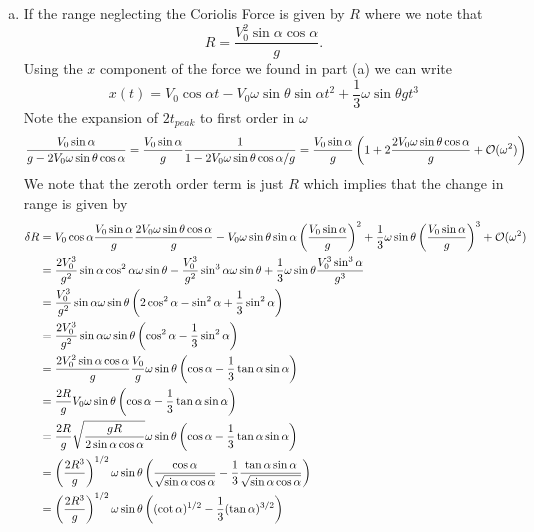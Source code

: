 \documentclass[11pt]{article}
\numberwithin{equation}{section}
\begin{document}
\begin{enumerate}[(a)]
\item If the range neglecting the Coriolis Force is given by $R$ where we note that 
$$R = \frac{V_0^2\sin\alpha\cos\alpha}{g}.$$
Using the $x$ component of the force we found in part (a) we can write 
$$x(t) = V_0\cos\alpha{t} - V_0\omega\sin\theta\sin\alpha{t^2} + \frac{1}{3}\omega\sin\theta{g}t^3$$
Note the expansion of $2t_{peak}$ to first order in $\omega$
$$\frac{V_0\sin\alpha}{g-2V_0\omega\sin\theta\cos\alpha} = \frac{V_0\sin\alpha}{g}\frac{1}{1-2V_0\omega\sin\theta\cos\alpha/g} = \frac{V_0\sin\alpha}{g}\left(1 + 2\frac{2V_0\omega\sin\theta\cos\alpha}{g} +\mathcal{O}(\omega^2)\right)$$
We note that the zeroth order term is just $R$ which implies that the change in range is
given by
\begin{align*}
\delta{R} &= V_0\cos\alpha\frac{V_0\sin\alpha}{g}\frac{2V_0\omega\sin\theta\cos\alpha}{g} - V_0\omega\sin\theta\sin\alpha\left(\frac{V_0\sin\alpha}{g}\right)^2 + \frac{1}{3}\omega\sin\theta\left(\frac{V_0\sin\alpha}{g}\right)^3 + \mathcal{O}(\omega^2)\\
&= \frac{2V_0^3}{g^2}\sin\alpha\cos^2\alpha\omega\sin\theta - \frac{V_0^3}{g^2}\sin^3\alpha\omega\sin\theta + \frac{1}{3}\omega\sin\theta\frac{V_0^3\sin^3\alpha}{g^3}\\
&= \frac{V_0^3}{g^2}\sin\alpha\omega\sin\theta\left(2\cos^2\alpha-\sin^2\alpha + \frac{1}{3}\sin^2\alpha\right)\\
&= \frac{2V_0^3}{g^2}\sin\alpha\omega\sin\theta\left(\cos^2\alpha-\frac{1}{3}\sin^2\alpha\right)\\
&= \frac{2V_0^2\sin\alpha\cos\alpha}{g}\frac{V_0}{g}\omega\sin\theta\left(\cos\alpha-\frac{1}{3}\tan\alpha\sin\alpha\right)\\
&= \frac{2R}{g}V_0\omega\sin\theta\left(\cos\alpha-\frac{1}{3}\tan\alpha\sin\alpha\right)\\
&= \frac{2R}{g}\sqrt{\frac{gR}{2\sin\alpha\cos\alpha}}\omega\sin\theta\left(\cos\alpha-\frac{1}{3}\tan\alpha\sin\alpha\right)\\
&= \left(\frac{2R^3}{g}\right)^{1/2}\omega\sin\theta\left(\frac{\cos\alpha}{\sqrt{\sin\alpha\cos\alpha}}-\frac{1}{3}\frac{\tan\alpha\sin\alpha}{\sqrt{\sin\alpha\cos\alpha}}\right)\\
&= \left(\frac{2R^3}{g}\right)^{1/2}\omega\sin\theta\left((\cot\alpha)^{1/2}-\frac{1}{3}(\tan\alpha)^{3/2}\right)
\end{align*}
\end{enumerate}

\pagebreak
\end{document}
